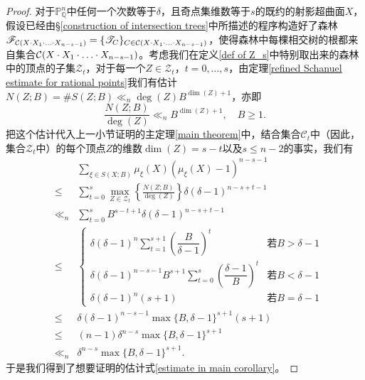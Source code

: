 \begin{proof}
对于$\mathbb{P}^n_{\mathbb{Q}}$中任何一个次数等于$\delta$，且奇点集维数等于$s$的既约的射影超曲面$X$，假设已经由\S \ref{construction of intersection trees}中所描述的程序构造好了森林$\mathscr{F}_{\mathcal C(X\cdot X_{1}\cdot\ldots\cdot X_{n-s-1})} = \{\mathscr T_C\}_{C\in\mathcal C(X\cdot X_{1}\cdot\ldots\cdot X_{n-s-1})}$，使得森林中每棵相交树的根都来自集合$\mathcal C(X\cdot X_{1}\cdot\ldots\cdot X_{n-s-1})$。考虑我们在定义\ref{def of Z_s}中特别取出来的森林中的顶点的子集$\mathcal{Z}_t$，对于每一个$Z \in \mathcal{Z}_t$，$t = 0,\ldots,s$，由定理\ref{refined Schanuel estimate for rational points}我们有估计$N(Z;B) = \#S(Z;B) \ll_{n} \deg(Z) B^{\dim(Z)+1}$，亦即
\begin{equation}
\frac{N(Z;B)}{\deg(Z)} \ll_{n} B^{\dim(Z)+1}, \quad B \geqslant 1.
\end{equation}
把这个估计代入上一小节证明的主定理\ref{main theorem}中，结合集合$\mathcal{C}_t$中（因此，集合$\mathcal{Z}_t$中）的每个顶点$Z$的维数$\dim(Z) = s - t$以及$s \leqslant n-2$的事实，我们有
\begin{eqnarray}
& & \sum_{\xi\in S(X;B)} \mu_\xi(X)(\mu_\xi(X)-1)^{n-s-1} \nonumber \\
& \leqslant & \sum_{t=0}^s \max_{Z\in\mathcal Z_t}\left\{\frac{N(Z;B)}{\deg(Z)}\right\}\delta(\delta-1)^{n-s+t-1} \\
& \ll_{n} & \sum_{t=0}^s B^{s-t+1}\delta(\delta-1)^{n-s+t-1} \\
& \leqslant & \begin{cases}
\delta(\delta-1)^n \sum\limits_{t=1}^{s+1} \left(\dfrac{B}{\delta-1}\right)^t & \text{若$B > \delta - 1$} \\
\delta(\delta-1)^{n-s-1}B^{s+1} \sum\limits_{t=0}^{s} \left(\dfrac{\delta-1}{B}\right)^t & \text{若$B < \delta - 1$} \\
\delta(\delta-1)^n(s+1) & \text{若$B = \delta - 1$}
\end{cases} \\
& \leqslant & \delta(\delta-1)^{n-s-1} \max\{B,\delta-1\}^{s+1} (s+1) \\
& \leqslant & (n-1) \delta^{n-s} \max\{B,\delta-1\}^{s+1} \\
& \ll_{n} & \delta^{n-s}\max\{B,\delta-1\}^{s+1}.
\end{eqnarray}
于是我们得到了想要证明的估计式\eqref{estimate in main corollary}。
\end{proof}

